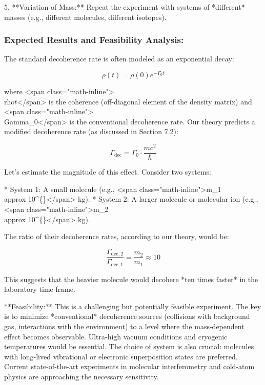 \documentclass{article}
\begin{document}
5.  **Variation of Mass:** Repeat the experiment with systems of *different* masses (e.g., different molecules, different isotopes).

\subsubsection{Expected Results and Feasibility Analysis:}

The standard decoherence rate is often modeled as an exponential decay:

\begin{equation}
	\rho(t) = \rho(0) e^{-\Gamma_0 t}
\end{equation}

where <span class="math-inline">\\rho\(t\)</span> is the coherence (off-diagonal element of the density matrix) and <span class="math-inline">\\Gamma\_0</span> is the conventional decoherence rate.  Our theory predicts a modified decoherence rate (as discussed in Section 7.2):

\begin{equation}
	\Gamma_{\text{dec}} = \Gamma_0 \cdot \frac{mc^2}{\hbar}
\end{equation}

Let's estimate the magnitude of this effect.  Consider two systems:

*   System 1: A small molecule (e.g., <span class="math-inline">m\_1 \\approx 10^\{\}</span> kg).
*   System 2: A larger molecule or molecular ion (e.g., <span class="math-inline">m\_2 \\approx 10^\{\}</span> kg).

The ratio of their decoherence rates, according to our theory, would be:

\begin{equation}
	\frac{\Gamma_{\text{dec},2}}{\Gamma_{\text{dec},1}} = \frac{m_2}{m_1} \approx 10
\end{equation}

This suggests that the heavier molecule would decohere *ten times faster* in the laboratory time frame.

**Feasibility:**  This is a challenging but potentially feasible experiment.  The key is to minimize *conventional* decoherence sources (collisions with background gas, interactions with the environment) to a level where the mass-dependent effect becomes observable.  Ultra-high vacuum conditions and cryogenic temperatures would be essential.  The choice of system is also crucial: molecules with long-lived vibrational or electronic superposition states are preferred.  Current state-of-the-art experiments in molecular interferometry and cold-atom physics are approaching the necessary sensitivity.
\end{document}
